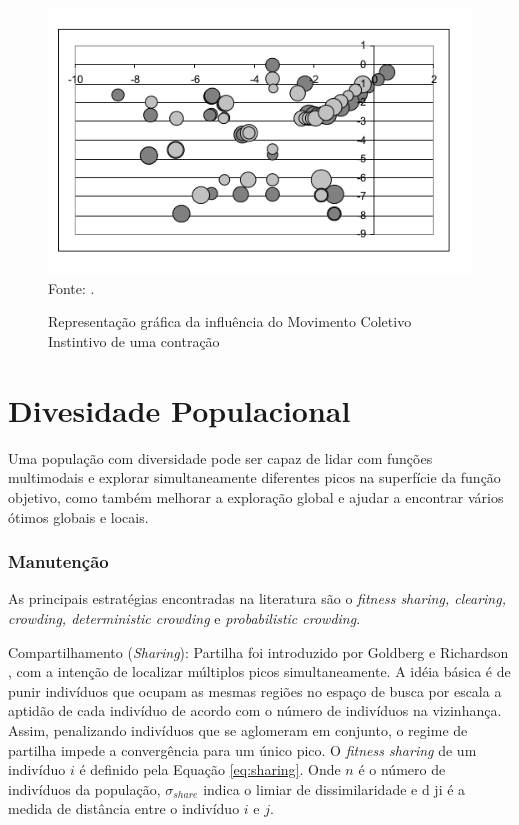 \begin{figure}[!htb]
	\caption{Representação gráfica da influência do Movimento Coletivo Instintivo de uma contração}
	\centering
	\includegraphics[scale=0.5]{images/movimento_volatil.png}
	\label{fig:volitute_moviment}{\\Fonte: .}
\end{figure}

\section{Divesidade Populacional}
\label{sec:population_diversity}
Uma população com diversidade pode ser capaz de lidar com funções multimodais e explorar simultaneamente diferentes picos na superfície da função objetivo, como também melhorar a exploração global e ajudar a encontrar vários ótimos globais e locais.

\subsubsection{Manutenção}
\label{sec:maintain_diversity}
As principais estratégias encontradas na literatura são o \textit{fitness sharing, clearing, crowding, deterministic crowding} e \textit{probabilistic crowding}.

Compartilhamento (\textit{Sharing}): Partilha foi introduzido por Goldberg e Richardson \cite{sharing}, com a intenção de localizar múltiplos picos simultaneamente. A idéia básica é de punir indivíduos que ocupam as mesmas regiões no espaço de busca por escala a aptidão de cada indivíduo de acordo com o número de indivíduos na vizinhança. Assim, penalizando indivíduos que se aglomeram em conjunto, o regime de partilha impede a convergência para um único pico. O \textit{fitness sharing} de um indivíduo $i$ é definido pela Equação \ref{eq:sharing}. Onde $n$ é o número de indivíduos da população, $\sigma_{share}$ indica o limiar de dissimilaridade e d ji é a medida de distância entre o indivíduo $i$ e $j$.

